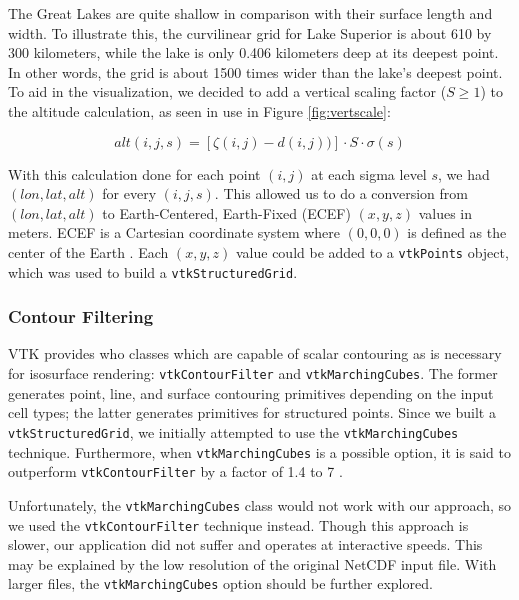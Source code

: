 \documentclass{article} %
\newcommand{\code}[1]{\texttt{#1}}
\begin{document}
The Great Lakes are quite shallow in comparison with their surface length and width.  To illustrate this, the curvilinear grid for Lake Superior is about 610 by 300 kilometers, while the lake is only 0.406 kilometers deep at its deepest point.  In other words, the grid is about 1500 times wider than the lake's deepest point.  To aid in the visualization, we decided to add a vertical scaling factor ($S \ge 1$) to the altitude calculation, as seen in use in Figure \ref{fig:vertscale}:

\begin{equation}\label{eq:finalAlt}
alt(i, j, s) = [\zeta(i, j) - d(i, j))] \cdot S \cdot \sigma(s)
\end{equation}

With this calculation done for each point $(i, j)$ at each sigma level $s$, we had $(lon, lat, alt)$ for every $(i, j, s)$.  This allowed us to do a conversion from $(lon, lat, alt)$ to Earth-Centered, Earth-Fixed (ECEF) $(x, y, z)$ values in meters.  ECEF is a Cartesian coordinate system where $(0, 0, 0)$ is defined as the center of the Earth \cite{geodesy}.  Each $(x, y, z)$ value could be added to a \code{vtkPoints} object, which was used to build a \code{vtkStructuredGrid}.

\subsubsection{Contour Filtering}

VTK provides who classes which are capable of scalar contouring as is necessary for isosurface rendering: \code{vtkContourFilter} and \code{vtkMarchingCubes}.  The former generates point, line, and surface contouring primitives depending on the input cell types; the latter generates primitives for structured points.  Since we built a \code{vtkStructuredGrid}, we initially attempted to use the \code{vtkMarchingCubes} technique.  Furthermore, when \code{vtkMarchingCubes} is a possible option, it is said to outperform \code{vtkContourFilter} by a factor of 1.4 to 7 \cite[p. 181]{vtkGuide}.

Unfortunately, the \code{vtkMarchingCubes} class would not work with our approach, so we used the \code{vtkContourFilter} technique instead.  Though this approach is slower, our application did not suffer and operates at interactive speeds.  This may be explained by the low resolution of the original NetCDF input file.  With larger files, the \code{vtkMarchingCubes} option should be further explored.
\end{document}
